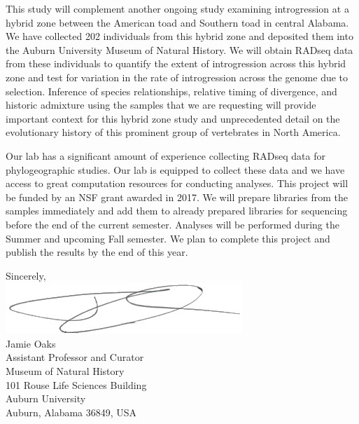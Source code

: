 \documentclass[fontsize=11pt,]{article}
\begin{document}
\vspace{2mm}

This study will complement another ongoing study examining
introgression at a hybrid zone between the American toad and Southern toad in
central Alabama.
We have collected 202 individuals from this hybrid zone and deposited 
them into the Auburn University Museum of Natural History.
We will obtain RADseq data from these individuals to quantify the extent of
introgression across this hybrid zone and test for variation in the rate of
introgression across the genome due to selection.
Inference of species relationships, relative timing of divergence, and historic
admixture using the samples that we are requesting will provide important
context for this hybrid zone study and unprecedented detail on the evolutionary
history of this prominent group of vertebrates in North America.

\vspace{2mm}

Our lab has a significant amount of experience collecting RADseq data for phylogeographic
studies. Our lab is equipped to collect these data and we have access to great 
computation resources for conducting analyses. This project will be funded by an 
NSF grant awarded in 2017. We will prepare libraries from the samples immediately   
and add them to already prepared libraries for sequencing before the end of the
current semester. Analyses will be performed during the Summer and upcoming Fall 
semester. We plan to complete this project and publish the results by the end of 
this year.

\vspace{2mm}

Sincerely,\\

\vspace{2mm}
\includegraphics[height=2.0\baselineskip]{jamie_signature.png}\\

Jamie Oaks\\
Assistant Professor and Curator \\
Museum of Natural History\\
101 Rouse Life Sciences Building\\
Auburn University\\
Auburn, Alabama 36849, USA
\end{document}
